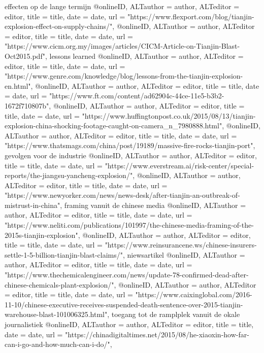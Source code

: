 {{{{{{{{{{{{{effecten op de lange termijn
@online{ID,	ALTauthor = {author},	ALTeditor = {editor},	title = {title},	date = {date},	url = {"https://www.flexport.com/blog/tianjin-explosion-effect-on-supply-chains/"},}
@online{ID,	ALTauthor = {author},	ALTeditor = {editor},	title = {title},	date = {date},	url = {"https://www.cicm.org.my/images/articles/CICM-Article-on-Tianjin-Blast-Oct2015.pdf"},}
lessons learned
@online{ID,	ALTauthor = {author},	ALTeditor = {editor},	title = {title},	date = {date},	url = {"https://www.genre.com/knowledge/blog/lessons-from-the-tianjin-explosion-en.html"},}
@online{ID,	ALTauthor = {author},	ALTeditor = {editor},	title = {title},	date = {date},	url = {"https://www.ft.com/content/ad62904c-44ce-11e5-b3b2-1672f710807b"},}
@online{ID,	ALTauthor = {author},	ALTeditor = {editor},	title = {title},	date = {date},	url = {"https://www.huffingtonpost.co.uk/2015/08/13/tianjin-explosion-china-shocking-footage-caught-on-camera_n_7980888.html"},}
@online{ID,	ALTauthor = {author},	ALTeditor = {editor},	title = {title},	date = {date},	url = {"https://www.thatsmags.com/china/post/19189/massive-fire-rocks-tianjin-port"},}
gevolgen voor de industrie
@online{ID,	ALTauthor = {author},	ALTeditor = {editor},	title = {title},	date = {date},	url = {"https://www.everstream.ai/risk-center/special-reports/the-jiangsu-yancheng-explosion/"},}
@online{ID,	ALTauthor = {author},	ALTeditor = {editor},	title = {title},	date = {date},	url = {"https://www.newyorker.com/news/news-desk/after-tianjin-an-outbreak-of-mistrust-in-china"},}
framing vanuit de chinese media
@online{ID,	ALTauthor = {author},	ALTeditor = {editor},	title = {title},	date = {date},	url = {"https://www.neliti.com/publications/101997/the-chinese-media-framing-of-the-2015s-tianjin-explosion"},}
@online{ID,	ALTauthor = {author},	ALTeditor = {editor},	title = {title},	date = {date},	url = {"https://www.reinsurancene.ws/chinese-insurers-settle-1-5-billion-tianjin-blast-claims/"},}
niewsartikel
@online{ID,	ALTauthor = {author},	ALTeditor = {editor},	title = {title},	date = {date},	url = {"https://www.thechemicalengineer.com/news/update-78-confirmed-dead-after-chinese-chemicals-plant-explosion/"},}
@online{ID,	ALTauthor = {author},	ALTeditor = {editor},	title = {title},	date = {date},	url = {"https://www.caixinglobal.com/2016-11-10/chinese-executive-receives-suspended-death-sentence-over-2015-tianjin-warehouse-blast-101006325.html"},}
toegang tot de ramplplek vanuit de okale journalistiek
@online{ID,	ALTauthor = {author},	ALTeditor = {editor},	title = {title},	date = {date},	url = {"https://chinadigitaltimes.net/2015/08/he-xiaoxin-how-far-can-i-go-and-how-much-can-i-do/"},}
}}}}}}}}}}}}}
